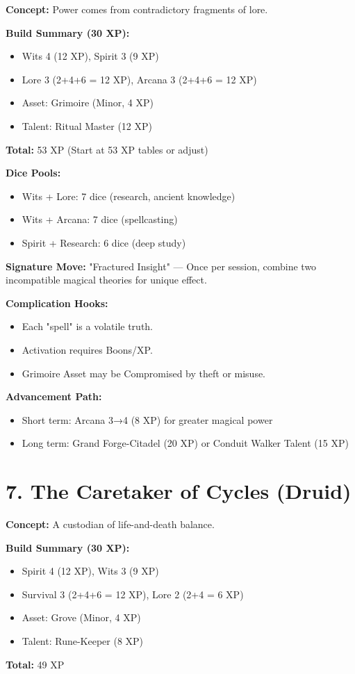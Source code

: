 \textbf{Concept:} Power comes from contradictory fragments of lore.

\textbf{Build Summary (30 XP):}
\begin{itemize}
  \item Wits 4 (12 XP), Spirit 3 (9 XP)
  \item Lore 3 (2+4+6 = 12 XP), Arcana 3 (2+4+6 = 12 XP)
  \item Asset: Grimoire (Minor, 4 XP)
  \item Talent: Ritual Master (12 XP)
\end{itemize}
\textbf{Total:} 53 XP (Start at 53 XP tables or adjust)

\textbf{Dice Pools:}
\begin{itemize}
  \item Wits + Lore: 7 dice (research, ancient knowledge)
  \item Wits + Arcana: 7 dice (spellcasting)
  \item Spirit + Research: 6 dice (deep study)
\end{itemize}

\textbf{Signature Move:} "Fractured Insight" — Once per session, combine two incompatible magical theories for unique effect.

\textbf{Complication Hooks:}
\begin{itemize}
  \item Each "spell" is a volatile truth.
  \item Activation requires Boons/XP.
  \item Grimoire Asset may be Compromised by theft or misuse.
\end{itemize}

\textbf{Advancement Path:}
\begin{itemize}
  \item Short term: Arcana 3→4 (8 XP) for greater magical power
  \item Long term: Grand Forge-Citadel (20 XP) or Conduit Walker Talent (15 XP)
\end{itemize}

\section{7. The Caretaker of Cycles (Druid)}

\textbf{Concept:} A custodian of life-and-death balance.

\textbf{Build Summary (30 XP):}
\begin{itemize}
  \item Spirit 4 (12 XP), Wits 3 (9 XP)
  \item Survival 3 (2+4+6 = 12 XP), Lore 2 (2+4 = 6 XP)
  \item Asset: Grove (Minor, 4 XP)
  \item Talent: Rune-Keeper (8 XP)
\end{itemize}
\textbf{Total:} 49 XP

